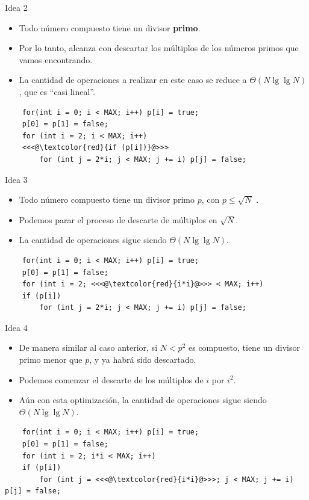 \documentclass{beamer}
\begin{document}
\begin{frame}[fragile]{Idea 2}
  \begin{itemize}
      \item Todo número compuesto tiene un divisor \textbf{primo}.
      \item Por lo tanto, alcanza con descartar los múltiplos de los números primos que vamos encontrando.
      \item La cantidad de operaciones a realizar en este caso se reduce a $\Theta(N \lg \lg N)$, que es ``casi lineal''.
  \end{itemize}

\begin{lstlisting}
    for(int i = 0; i < MAX; i++) p[i] = true;
    p[0] = p[1] = false;
    for (int i = 2; i < MAX; i++)
    <<<@\textcolor{red}{if (p[i])}@>>>
        for (int j = 2*i; j < MAX; j += i) p[j] = false;
\end{lstlisting}
\end{frame}

\begin{frame}[fragile]{Idea 3}
  \begin{itemize}
      \item Todo número compuesto tiene un divisor primo $p$, con $p \leq \sqrt{N}$ .
      \item Podemos parar el proceso de descarte de múltiplos en $\sqrt{N}$.
      \item La cantidad de operaciones sigue siendo $\Theta(N \lg \lg N)$.
  \end{itemize}

\begin{lstlisting}
    for(int i = 0; i < MAX; i++) p[i] = true;
    p[0] = p[1] = false;
    for (int i = 2; <<<@\textcolor{red}{i*i}@>>> < MAX; i++)
    if (p[i])
        for (int j = 2*i; j < MAX; j += i) p[j] = false;
\end{lstlisting}
\end{frame}

\begin{frame}[fragile]{Idea 4}
  \begin{itemize}
      \item De manera similar al caso anterior, si $N < p^2$ es compuesto, tiene un divisor primo menor que $p$, y ya habrá sido descartado.
      \item Podemos comenzar el descarte de los múltiplos de $i$ por $i^2$.
      \item Aún con esta optimización, la cantidad de operaciones sigue siendo $\Theta(N \lg \lg N)$.
  \end{itemize}

\begin{lstlisting}
    for(int i = 0; i < MAX; i++) p[i] = true;
    p[0] = p[1] = false;
    for (int i = 2; i*i < MAX; i++)
    if (p[i])
        for (int j = <<<@\textcolor{red}{i*i}@>>>; j < MAX; j += i) p[j] = false;
\end{lstlisting}
\end{frame}
\end{document}
